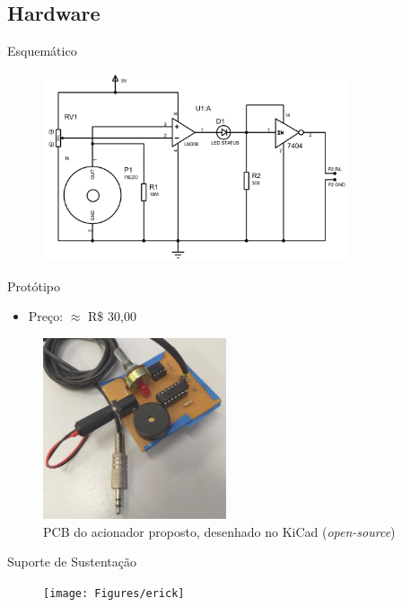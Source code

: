 \subsection{Hardware}


\begin{frame}{Esquem\'atico}

\begin{figure}
	\includegraphics[width=0.8\textwidth]{Figures/acionador}
\end{figure}

\end{frame}
\begin{frame}{Prot\'otipo}
\begin{itemize}
\item Pre\c{c}o: $\approx$ R\$ 30,00
\end{itemize}

\begin{figure}
	\includegraphics[width=0.48\textwidth]{Figures/puff2}\quad
	\caption{PCB do acionador proposto, desenhado no KiCad (\textit{open-source})}
\end{figure}

\end{frame}
\begin{frame}{Suporte de Sustenta\c{c}\~ao}

\begin{figure}
	\texttt{[image: Figures/erick]}
\end{figure}

\end{frame}

